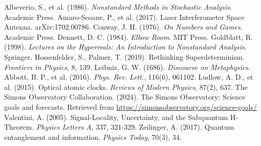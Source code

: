 \documentclass{article}
\begin{document}
\begin{thebibliography}{9}
 Albeverio, S., et al. (1986). \emph{Nonstandard Methods in Stochastic Analysis}. Academic Press.
 Amaro-Seoane, P., et al. (2017). Laser Interferometer Space Antenna. arXiv:1702.00786.
 Conway, J. H. (1976). \emph{On Numbers and Games}. Academic Press.
 Dennett, D. C. (1984). \emph{Elbow Room}. MIT Press.
 Goldblatt, R. (1998). \emph{Lectures on the Hyperreals: An Introduction to Nonstandard Analysis}. Springer.
 Hossenfelder, S., Palmer, T. (2019). Rethinking Superdeterminism. \emph{Frontiers in Physics}, 8, 139.
 Leibniz, G. W. (1686). \emph{Discourse on Metaphysics}.
 Abbott, B. P., et al. (2016). \emph{Phys. Rev. Lett.}, 116(6), 061102.
 Ludlow, A. D., et al. (2015). Optical atomic clocks. \emph{Reviews of Modern Physics}, 87(2), 637.
 The Simons Observatory Collaboration. (2024). The Simons Observatory: Science goals and forecasts. Retrieved from \url{https://simonsobservatory.org/science-goals/}
 Valentini, A. (2005). Signal-Locality, Uncertainty, and the Subquantum H-Theorem. \emph{Physics Letters A}, 337, 321-329.
 Zeilinger, A. (2017). Quantum entanglement and information. \emph{Physics Today}, 70(3), 34.
\end{thebibliography}
\end{document}
